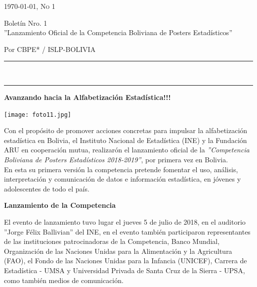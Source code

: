 \documentclass[8pt,a4paper]{article} %
\newcommand{\HorRule}[1]{\noindent\rule{\linewidth}{#1}} %
\newcommand{\NewsletterName}[1]{ %
\begin{center}
\Huge \usefont{T1}{fvs}{b}{n} %
#1
\end{center}	
\par \normalsize \normalfont}
\newcommand{\JournalIssue}[1]{ %
\hfill \textsc{\mydate \today, No #1} %
\par \normalsize \normalfont}
\newcommand{\NewsItem}[1]{ %
\usefont{T1}{fvs}{n}{n} %
\vspace{24pt}\large #1\vspace{3pt} %
\par \normalsize \normalfont}
\newcommand{\NewsAuthor}[1]{ %
\hfill Por \textsc{#1} \vspace{20pt} %
\par \normalfont}
\begin{document}
\JournalIssue{1} %

\NewsletterName{Boletín Nro. 1\\ 
''Lanzamiento Oficial de la Competencia Boliviana de Posters Estadísticos''} %
\NewsAuthor{CBPE* / ISLP-BOLIVIA}
\noindent\HorRule{3pt} \\[-0.75\baselineskip] %
\HorRule{1pt} %


\begin{multicols}{2} %

\NewsItem{\textbf{Avanzando hacia la Alfabetización Estadística!!!}} 

\vspace{0.2cm}

\begin{center}
\texttt{[image: foto11.jpg]} %
\end{center}

\vspace{0.2cm}

Con el propósito de promover acciones concretas para impulsar la alfabetización estadística en Bolivia, el Instituto Nacional de Estadística (INE) y la Fundación ARU en cooperación mutua, realizarón el lanzamiento
 oficial de la {\it ''Competencia Boliviana de Posters Estadísticos 2018-2019''}, por primera vez en Bolivia.\\
 
 En esta su primera versión la competencia pretende fomentar el uso, análisis, interpretación y comunicación de datos e
 información estadística, en jóvenes y adolescentes de todo el país.

\NewsItem{\textbf{Lanzamiento de la Competencia}} 

\vspace{0.2cm}

El evento de lanzamiento tuvo lugar
 el jueves 5 de julio de 2018,  en el auditorio ''Jorge Félix Ballivian'' del INE, en el evento también participaron
 representantes de las instituciones patrocinadoras de la Competencia, Banco Mundial, Organización de las 
Naciones Unidas para la Alimentación y la Agricultura (FAO), el Fondo de las Naciones Unidas para la Infancia (UNICEF),
 Carrera de Estadística - UMSA y Universidad Privada de Santa Cruz de la Sierra - UPSA, como también medios de comunicación.


\end{multicols}
\end{document}
